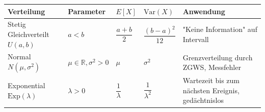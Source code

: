 \begin{mytable}
    \begin{tabular}{|l|l|l|l|p{5cm}|}
        \hline
        \textbf{Verteilung} & \textbf{Parameter} & $E[X]$ & $\text{Var}(X)$ & \textbf{Anwendung} \\
        \hline
        Stetig Gleichverteilt $U(a,b)$ & $a<b$ & $\dfrac{a+b}{2}$ & $\dfrac{(b-a)^2}{12}$ & "Keine Information" auf Intervall \\
        \hline
        Normal $N(\mu,\sigma^2)$ & $\mu \in \mathbb{R}, \sigma^2>0$ & $\mu$ & $\sigma^2$ & Grenzverteilung durch ZGWS, Messfehler \\
        \hline
        Exponential $\text{Exp}(\lambda)$ & $\lambda>0$ & $\dfrac{1}{\lambda}$ & $\dfrac{1}{\lambda^2}$ & Wartezeit
        bis zum nächsten Ereignis, gedächtnislos %
    \end{tabular}
    \caption{Stetige Verteilungen}
\end{mytable}



